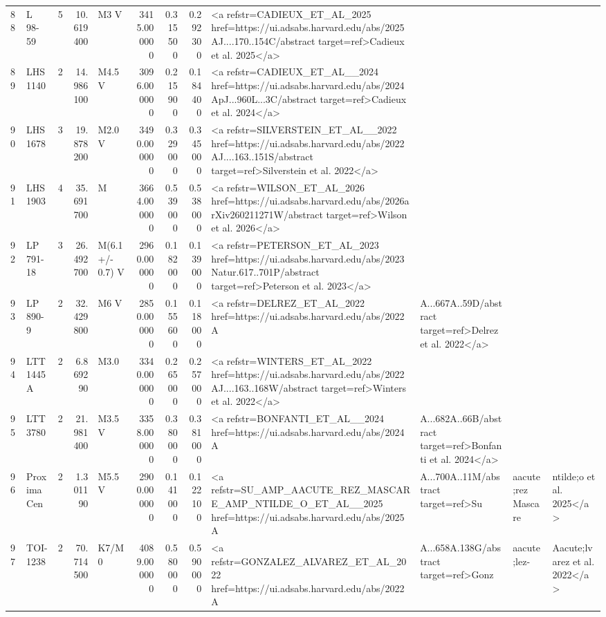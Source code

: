 \begin{tabular}{llrrlrrrl}
88 & L 98-59 & 5 & 10.619400 & M3 V & 3415.000000 & 0.315500 & 0.292300 & <a refstr=CADIEUX_ET_AL_2025 href=https://ui.adsabs.harvard.edu/abs/2025AJ....170..154C/abstract target=ref>Cadieux et al. 2025</a> \\
89 & LHS 1140 & 2 & 14.986100 & M4.5 V & 3096.000000 & 0.215900 & 0.184400 & <a refstr=CADIEUX_ET_AL__2024 href=https://ui.adsabs.harvard.edu/abs/2024ApJ...960L...3C/abstract target=ref>Cadieux et al. 2024</a> \\
90 & LHS 1678 & 3 & 19.878200 & M2.0 V & 3490.000000 & 0.329000 & 0.345000 & <a refstr=SILVERSTEIN_ET_AL__2022 href=https://ui.adsabs.harvard.edu/abs/2022AJ....163..151S/abstract target=ref>Silverstein et al. 2022</a> \\
91 & LHS 1903 & 4 & 35.691700 & M & 3664.000000 & 0.539000 & 0.538000 & <a refstr=WILSON_ET_AL_2026 href=https://ui.adsabs.harvard.edu/abs/2026arXiv260211271W/abstract target=ref>Wilson et al. 2026</a> \\
92 & LP 791-18 & 3 & 26.492700 & M(6.1 +/- 0.7) V & 2960.000000 & 0.182000 & 0.139000 & <a refstr=PETERSON_ET_AL_2023 href=https://ui.adsabs.harvard.edu/abs/2023Natur.617..701P/abstract target=ref>Peterson et al. 2023</a> \\
93 & LP 890-9 & 2 & 32.429800 & M6 V & 2850.000000 & 0.155600 & 0.118000 & <a refstr=DELREZ_ET_AL_2022 href=https://ui.adsabs.harvard.edu/abs/2022A&A...667A..59D/abstract target=ref>Delrez et al. 2022</a> \\
94 & LTT 1445 A & 2 & 6.869290 & M3.0 & 3340.000000 & 0.265000 & 0.257000 & <a refstr=WINTERS_ET_AL_2022 href=https://ui.adsabs.harvard.edu/abs/2022AJ....163..168W/abstract target=ref>Winters et al. 2022</a> \\
95 & LTT 3780 & 2 & 21.981400 & M3.5 V & 3358.000000 & 0.380000 & 0.381000 & <a refstr=BONFANTI_ET_AL__2024 href=https://ui.adsabs.harvard.edu/abs/2024A&A...682A..66B/abstract target=ref>Bonfanti et al. 2024</a> \\
96 & Proxima Cen & 2 & 1.301190 & M5.5 V & 2900.000000 & 0.141000 & 0.122100 & <a refstr=SU_AMP_AACUTE_REZ_MASCARE_AMP_NTILDE_O_ET_AL__2025 href=https://ui.adsabs.harvard.edu/abs/2025A&A...700A..11M/abstract target=ref>Su&aacute;rez Mascare&ntilde;o et al. 2025</a> \\
97 & TOI-1238 & 2 & 70.714500 & K7/M0 & 4089.000000 & 0.580000 & 0.590000 & <a refstr=GONZALEZ_ALVAREZ_ET_AL_2022 href=https://ui.adsabs.harvard.edu/abs/2022A&A...658A.138G/abstract target=ref>Gonz&aacute;lez-&Aacute;lvarez et al. 2022</a> \\

\end{tabular}
